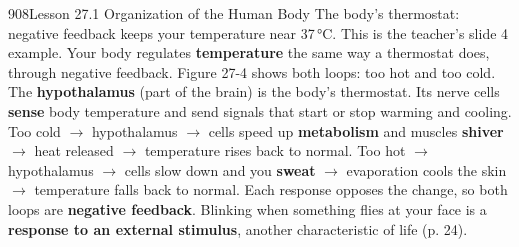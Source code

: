 \documentclass[11pt,letterpaper]{article}
\begin{document}
\begin{tbpage}{908}{Lesson 27.1 Organization of the Human Body}
  {The body's thermostat: negative feedback keeps your temperature near 37\,°C. This is the teacher's slide 4 example.}
    {Your body regulates \textbf{temperature} the same way a thermostat does, through negative feedback. Figure 27-4 shows both loops: too hot and too cold.}
    {The \textbf{hypothalamus} (part of the brain) is the body's thermostat. Its nerve cells \textbf{sense} body temperature and send signals that start or stop warming and cooling.}
    {Too cold $\rightarrow$ hypothalamus $\rightarrow$ cells speed up \textbf{metabolism} and muscles \textbf{shiver} $\rightarrow$ heat released $\rightarrow$ temperature rises back to normal.}
    {Too hot $\rightarrow$ hypothalamus $\rightarrow$ cells slow down and you \textbf{sweat} $\rightarrow$ evaporation cools the skin $\rightarrow$ temperature falls back to normal. Each response opposes the change, so both loops are \textbf{negative feedback}.}
    {Blinking when something flies at your face is a \textbf{response to an external stimulus}, another characteristic of life (p. 24).}
\end{tbpage}
\end{document}
